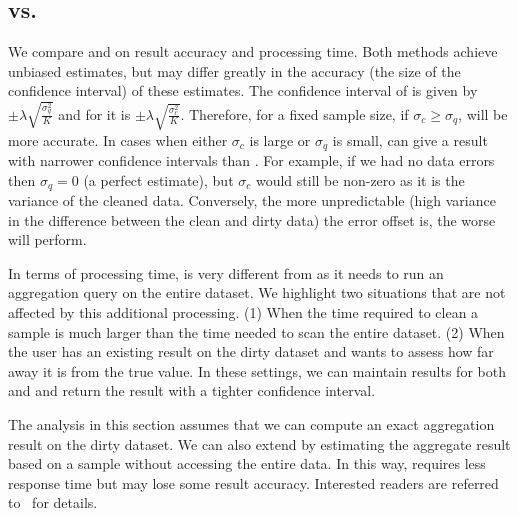 \subsection{\bias vs. \sampleclean}
We compare \sampleclean and \bias on result accuracy and processing time.
Both methods achieve unbiased estimates, but may differ greatly in the accuracy (the size of the confidence interval) of these estimates.
The confidence interval of \bias is given by $\pm\lambda\sqrt{\frac{\sigma_q^2}{K}}$ and for \sampleclean it is  $\pm\lambda\sqrt{\frac{\sigma_c^2}{K}}$.
Therefore, for a fixed sample size, if $\sigma_c \ge \sigma_q$, \bias will be more accurate.
In cases when either $\sigma_c$ is large or $\sigma_q$ is small, \bias can give a result with narrower confidence intervals than \sampleclean.
For example, if we had no data errors then $\sigma_q = 0$ (a perfect \bias estimate), but $\sigma_c$ would still be non-zero as it is the variance of the cleaned data.
Conversely, the more unpredictable (high variance in the difference between the clean and dirty data) the error offset is, the worse \bias will perform.

In terms of processing time, \bias is very different from \sampleclean as it needs to run an aggregation query on the entire dataset.
We highlight two situations that are not affected by this additional processing.
(1) When the time required to clean a sample is much larger than the time needed to scan the entire dataset.
(2) When the user has an existing result on the dirty dataset and wants to assess how far away it is from the true value.
In these settings, we can maintain results for both \sampleclean and \bias and return the result with a tighter confidence interval.

The analysis in this section assumes that we can compute an exact aggregation result on the dirty dataset.
We can also extend \biascorrected by estimating the aggregate result based on a sample without accessing the entire data.
In this way, \biascorrected requires less response time but may lose some result accuracy.
Interested readers are referred to~\cite{saqpfull} for details.

